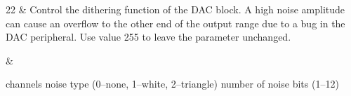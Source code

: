 \begin{cmdlist}
	22 & 
	Control the dithering function of the \gls{DAC} block. A high noise amplitude can cause an overflow to the other end of the output range due to a bug in the \gls{DAC} peripheral. Use value 255 to leave the parameter unchanged.

	& \begin{cmdreq}
		 channels
		 noise type (0--none, 1--white, 2--triangle)
		 number of noise bits (1--12)
	\end{cmdreq} \\
\end{cmdlist}



